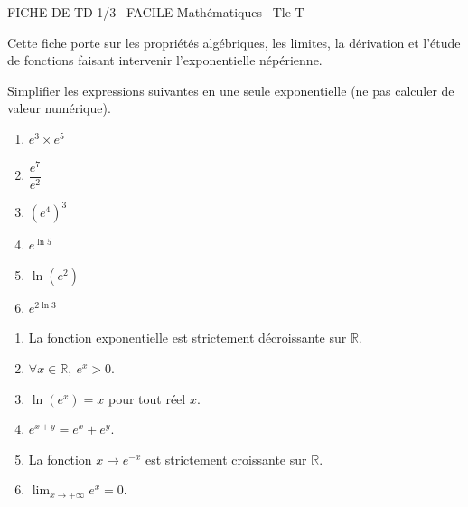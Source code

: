 \documentclass[11pt]{article}
\begin{document}
\begin{tcolorbox}[enhanced,colback=popink,colframe=popink,arc=10pt,boxrule=0pt,left=12pt,right=12pt,top=9pt,bottom=9pt]
{\color{white}\popxbold\small FICHE DE TD 1/3 \textbullet\ FACILE \hfill Mathématiques \textbullet\ Tle T\par}
\end{tcolorbox}
\vspace{4pt}
\noindent Cette fiche porte sur les propriétés algébriques, les limites, la dérivation et l'étude de fonctions faisant intervenir l'exponentielle népérienne.

\begin{exercice}
Simplifier les expressions suivantes en une seule exponentielle (ne pas calculer de valeur numérique).
\begin{enumerate}
    \item $e^{3} \times e^{5}$
    \item $\dfrac{e^{7}}{e^{2}}$
    \item $(e^{4})^{3}$
    \item $e^{\ln 5}$
    \item $\ln(e^{2})$
    \item $e^{2\ln 3}$
\end{enumerate}
\end{exercice}

\begin{exercice}
\begin{enumerate}
    \item La fonction exponentielle est strictement décroissante sur $\mathbb{R}$.
    \item $\forall x \in \mathbb{R},\ e^{x} > 0$.
    \item $\ln(e^{x}) = x$ pour tout réel $x$.
    \item $e^{x+y} = e^{x} + e^{y}$.
    \item La fonction $x \mapsto e^{-x}$ est strictement croissante sur $\mathbb{R}$.
    \item $\displaystyle\lim_{x \to +\infty} e^{x} = 0$.
\end{enumerate}
\end{exercice}
\end{document}
